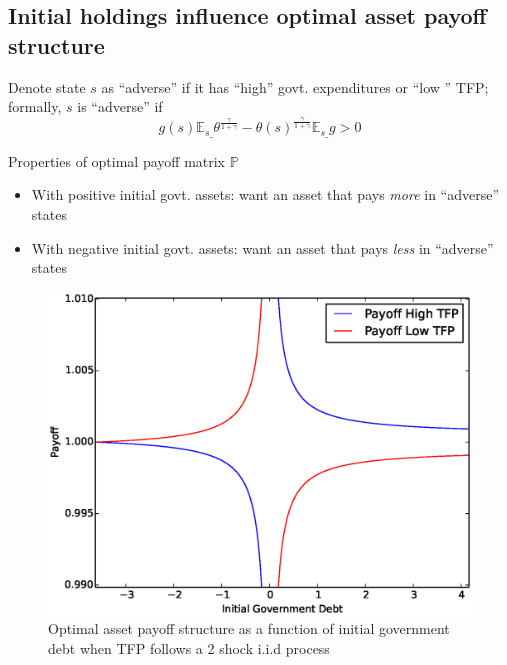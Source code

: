 \documentclass[12pt]{article}
\newcommand{\EE}{\mathbb E}
\begin{document}
 \subsection{Initial holdings influence optimal asset payoff structure}
Denote state $s$ as ``adverse''  if it has ``high'' govt. expenditures or ``low '' TFP; formally, $s$ is ``adverse'' if
\[   g(s)\EE_{s\_}\theta^\frac{\gamma}{1+\gamma}-\theta(s)^\frac\gamma{1+\gamma}\EE_{s\_} g >0\]

Properties of  optimal payoff matrix $\mathbb{P}$

\begin{itemize}
 \item With positive initial govt. assets: want an asset  that pays {\em more} in ``adverse'' states
 \item With negative initial govt. assets: want an asset  that pays {\em less} in ``adverse'' states
\end{itemize}

\begin{figure}
		\begin{center}
		\includegraphics[scale=.4]{Images/p_graph_tfp.eps}
		\caption{Optimal asset payoff structure as a function of initial government debt when TFP follows a 2 shock i.i.d process}
	\end{center}	
	\end{figure}
\end{document}
